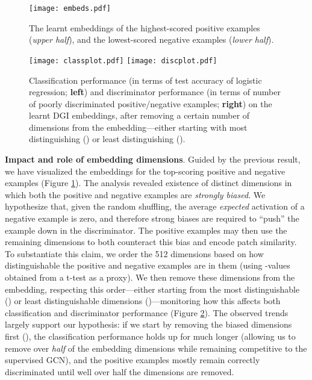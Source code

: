 \documentclass{article} \usepackage{iclr2019_conference,times}
\newcommand{\xhdr}[1]{{\noindent\bfseries #1}.}
\begin{document}
\begin{figure}
\centering
  \texttt{[image: embeds.pdf]}
  \caption{The learnt embeddings of the highest-scored positive examples (\emph{upper half}), and the lowest-scored negative examples (\emph{lower half}).}
  \label{fig:embeds}
\end{figure}

\begin{figure}
\centering
\texttt{[image: classplot.pdf]}
\texttt{[image: discplot.pdf]}
\caption{Classification performance (in terms of test accuracy of logistic regression; {\bf left}) and discriminator performance (in terms of number of poorly discriminated positive/negative examples; {\bf right}) on the learnt DGI embeddings, after removing a certain number of dimensions from the embedding---either starting with most distinguishing () or least distinguishing ().}
\label{fig:cora_embs}
\end{figure}

\xhdr{Impact and role of embedding dimensions}
Guided by the previous result, we have visualized the embeddings for the top-scoring positive and negative examples (Figure \ref{fig:embeds}). The analysis revealed existence of distinct dimensions in which both the positive and negative examples are \emph{strongly biased}. We hypothesize that, given the random shuffling, the average \emph{expected} activation of a negative example is zero, and therefore strong biases are required to ``push'' the example down in the discriminator. The positive examples may then use the remaining dimensions to both counteract this bias and encode patch similarity. To substantiate this claim, we order the 512 dimensions based on how distinguishable the positive and negative examples are in them (using -values obtained from a t-test as a proxy). We then remove these dimensions from the embedding, respecting this order---either starting from the most distinguishable () or least distinguishable dimensions ()---monitoring how this affects both classification and discriminator performance (Figure \ref{fig:cora_embs}). The observed trends largely support our hypothesis: if we start by removing the biased dimensions first (), the classification performance holds up for much longer (allowing us to remove over \emph{half} of the embedding dimensions while remaining competitive to the supervised GCN), and the positive examples mostly remain correctly discriminated until well over half the dimensions are removed.
\end{document}

